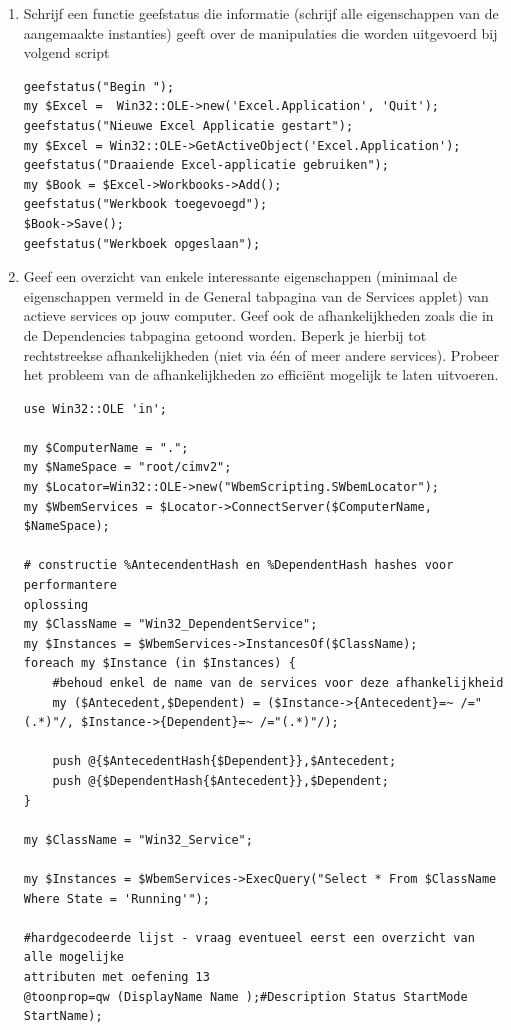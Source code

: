 \documentclass[11pt,a4paper]{report}
\begin{document}
\begin{enumerate}[resume]
	\item Schrijf een functie geefstatus die informatie (schrijf alle eigenschappen van de aangemaakte instanties) geeft over de manipulaties die worden uitgevoerd bij volgend script
	\begin{lstlisting}
geefstatus("Begin ");
my $Excel =  Win32::OLE->new('Excel.Application', 'Quit');
geefstatus("Nieuwe Excel Applicatie gestart");
my $Excel = Win32::OLE->GetActiveObject('Excel.Application');
geefstatus("Draaiende Excel-applicatie gebruiken");
my $Book = $Excel->Workbooks->Add();
geefstatus("Werkbook toegevoegd");
$Book->Save();
geefstatus("Werkboek opgeslaan");
	\end{lstlisting}
	\item Geef een overzicht van enkele interessante eigenschappen (minimaal de eigenschappen vermeld in de General tabpagina van de Services applet) van actieve services op jouw computer. Geef ook de afhankelijkheden zoals die in de Dependencies tabpagina getoond worden. Beperk je hierbij tot rechtstreekse afhankelijkheden (niet via één of meer andere services). Probeer het probleem van de afhankelijkheden zo efficiënt mogelijk te laten uitvoeren.
	\begin{lstlisting}
use Win32::OLE 'in';

my $ComputerName = ".";
my $NameSpace = "root/cimv2";
my $Locator=Win32::OLE->new("WbemScripting.SWbemLocator");
my $WbemServices = $Locator->ConnectServer($ComputerName, $NameSpace);

# constructie %AntecendentHash en %DependentHash hashes voor performantere 
oplossing
my $ClassName = "Win32_DependentService";
my $Instances = $WbemServices->InstancesOf($ClassName);
foreach my $Instance (in $Instances) {
	#behoud enkel de name van de services voor deze afhankelijkheid
	my ($Antecedent,$Dependent) = ($Instance->{Antecedent}=~ /="(.*)"/, $Instance->{Dependent}=~ /="(.*)"/);
	
	push @{$AntecedentHash{$Dependent}},$Antecedent;
	push @{$DependentHash{$Antecedent}},$Dependent;
}

my $ClassName = "Win32_Service";

my $Instances = $WbemServices->ExecQuery("Select * From $ClassName Where State = 'Running'");

#hardgecodeerde lijst - vraag eventueel eerst een overzicht van alle mogelijke 
attributen met oefening 13
@toonprop=qw (DisplayName Name );#Description Status StartMode StartName);


\end{lstlisting}
\end{enumerate}
\end{document}
